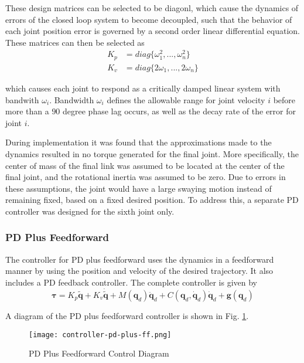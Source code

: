 \documentclass[conference]{IEEEtran}
\begin{document}
These design matrices can be selected to be diagonl, which cause the
dynamics of errors of the closed loop system to become decoupled, such that the
behavior of each joint position error is governed by a second order linear
differential equation. These matrices can then be selected as
\begin{align*}
  K_p &= diag\{\omega_1^2, ... , \omega_n^2\} \\
  K_v &= diag\{2\omega_1, ... , 2\omega_n\}
\end{align*}

which causes each joint to respond as a critically damped linear system with
bandwith $\omega_i$. Bandwidth $\omega_i$ defines the allowable range for joint
velocity $i$ before more than a $90$ degree phase lag occurs, as well as the
decay rate of the error for joint $i$.

During implementation it was found that the approximations made to the dynamics
resulted in no torque generated for the final joint. More specifically, the
center of mass of the final link was assumed to be located at the center of the
final joint, and the rotational inertia was assumed to be zero. Due to errors in
these assumptions, the joint would have a large swaying motion instead of
remaining fixed, based on a fixed desired position. To address this, a separate
PD controller was designed for the sixth joint only.

\subsubsection{PD Plus Feedforward}
The controller for PD plus feedforward uses the dynamics in a feedforward manner
by using the position and velocity of the desired trajectory. It also includes a
PD feedback controller. The complete controller is given by
\begin{equation*}
  \boldsymbol{\tau} = K_p \tilde{\boldsymbol{q}} + K_v \dot{\tilde{\boldsymbol{q}}} + M(\boldsymbol{q}_d)\ddot{\boldsymbol{q}}_d +  C(\boldsymbol{q}_d, \dot{\boldsymbol{q}}_d)\dot{\boldsymbol{q}}_d + \boldsymbol{g}(\boldsymbol{q}_d)
\end{equation*}

A diagram of the PD plus feedforward controller is shown in
Fig. \ref{fig:pd-plus-ff}.

\begin{figure}[!t]
  \texttt{[image: controller-pd-plus-ff.png]}
  \caption{PD Plus Feedforward Control Diagram}
  \label{fig:pd-plus-ff}
\end{figure}
\end{document}
